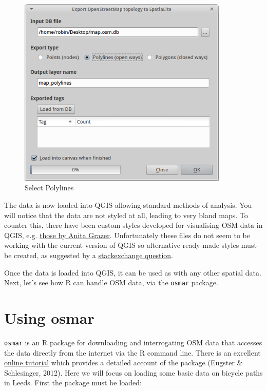 \documentclass[]{article}
\let\Oldincludegraphics\includegraphics
\renewcommand{\includegraphics}[1]{\Oldincludegraphics[width=10cm]{#1}}
\begin{document}
\begin{figure}[htbp]
\centering
\includegraphics{osmfigs/open-osmdb.png}
\caption{Select Polylines}
\end{figure}

The data is now loaded into QGIS allowing standard methods of analysis.
You will notice that the data are not styled at all, leading to very
bland maps. To counter this, there have been custom styles developed for
visualising OSM data in QGIS, e.g.
\href{http://anitagraser.com/2012/02/25/light-styles-for-osm-layers-in-qgis/}{those
by Anita Grazer}. Unfortunately these files do not seem to be working
with the current version of QGIS so alternative ready-made styles must
be created, as suggested by a
\href{http://gis.stackexchange.com/questions/42645/is-there-up-to-date-osm-sld-file-for-geoserver}{stackexchange
question}.

Once the data is loaded into QGIS, it can be used as with any other
spatial data. Next, let's see how R can handle OSM data, via the
\texttt{osmar} package.

\section{Using osmar}

\texttt{osmar} is an R package for downloading and interrogating OSM
data that accesses the data directly from the internet via the R command
line. There is an excellent
\href{http://journal.r-project.org/archive/2013-1/eugster-schlesinger.pdf}{online
tutorial} which provides a detailed account of the package (Eugster \&
Schlesinger, 2012). Here we will focus on loading some basic data on
bicycle paths in Leeds. First the package must be loaded:
\end{document}
